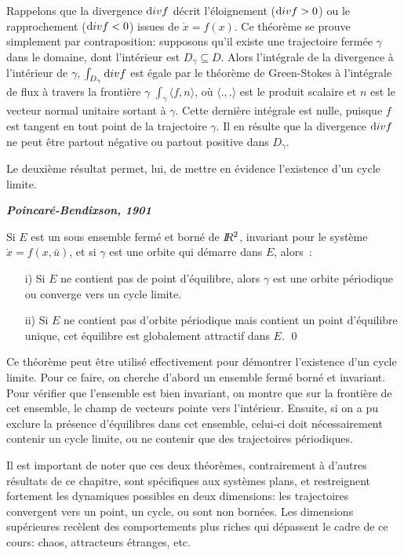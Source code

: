 {Rappelons que la divergence  ${\mbox div}f$ décrit l'éloignement (${\mbox div}f >0$) ou le rapprochement (${\mbox div}f <0$) issues de $\dot{x}=f(x)$.
Ce théorème se prouve simplement par contraposition: supposons qu'il existe une trajectoire fermée $\gamma$ dans le domaine, dont l'intérieur est $D_{\gamma} \subseteq D$. Alors 
l'intégrale de la divergence à l'intérieur de $\gamma$, $\int_{D_\gamma}  {\mbox div}f$ est égale par le théorème de Green-Stokes à l'intégrale de flux à travers la frontière $\gamma$ $\int_\gamma \langle f, n \rangle$, où $\langle.,.\rangle$ est le produit scalaire et $n$ est le vecteur normal unitaire sortant à $\gamma$. Cette dernière intégrale est nulle, puisque $f$ est tangent en tout point de la trajectoire $\gamma$. Il en résulte que la divergence ${\mbox div}f$ ne peut être partout négative ou partout positive dans $D_{\gamma}$.

Le deuxi{è}me r{é}sultat permet, lui, de mettre en {é}vidence l'existence d'un cycle
limite.  

\begin{theoreme} {\bf \em Poincar{é}-Bendixson, 1901}

Si $E$ est un sous ensemble fermé et borné de $I \! \! R^2$, invariant  pour le système
$\dot x= f(x,\bar u)$, et si $\gamma$ est une orbite qui d{é}marre dans $E$, alors~:
\begin{itemize}
\item[i)] Si $E$ ne contient pas de point d'{é}quilibre, alors $\gamma$ est une orbite
p{é}riodique ou converge vers un cycle limite.
\item[ii)]Si $E$ ne contient pas d'orbite p{é}riodique mais contient un point d'{é}quilibre
unique, cet {é}quilibre est globalement attractif dans $E$. \qed
\end{itemize}
\end{theoreme}


Ce th{é}or{è}me peut {ê}tre utilis{é} effectivement pour d{é}montrer l'existence d'un
cycle limite. Pour ce faire, on cherche d'abord un ensemble ferm{é} born{é} et invariant.
Pour v{é}rifier que l'ensemble est bien invariant, on montre que sur la fronti{è}re de cet
ensemble, le champ de vecteurs pointe vers l'int{é}rieur. Ensuite, si on a pu exclure la
pr{é}sence d'{é}quilibres dans cet ensemble, celui-ci doit n{é}cessairement contenir un
cycle limite, ou ne contenir que des trajectoires p{é}riodiques.

Il est important de noter que ces deux théorèmes, contrairement à d'autres résultats de ce chapitre, sont spécifiques aux systèmes plans, et restreignent fortement les dynamiques possibles en deux dimensions: les trajectoires convergent vers un point, un cycle, ou sont non bornées. Les dimensions supérieures recèlent des comportements plus riches qui dépassent le cadre de ce cours: chaos, attracteurs étranges, etc.

}
